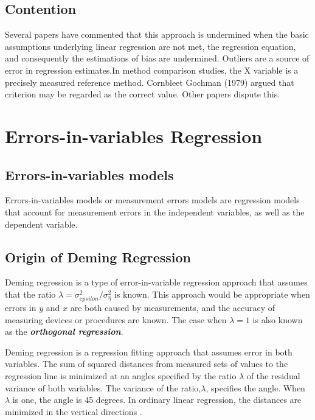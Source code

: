 \documentclass[12pt, a4paper]{report}
\theoremstyle{plain}
\theoremstyle{definition}
\theoremstyle{remark}
\begin{document}



	


\section{Contention }
Several papers have commented that this approach is undermined
when the basic assumptions underlying linear regression are not
met, the regression equation, and consequently the estimations of
bias are undermined. Outliers are a source of error in regression
estimates.In method comparison studies, the X variable is a
precisely measured reference method. Cornbleet Gochman (1979)
argued that criterion may be regarded as the correct value. Other
papers dispute this.







\chapter{Errors-in-variables Regression}





\section{Errors-in-variables models}

Errors-in-variables models or measurement errors models are regression models that account for measurement errors in the independent variables, as well as the dependent variable.


\section{Origin of Deming Regression}

Deming regression is a type of error-in-variable regression approach that assumes that the ratio $\lambda = \sigma^2_{epsilon}/\sigma^2_{\eta}$ is known. This approach would be appropriate when errors in $y$ and $x$ are both caused by measurements, and the accuracy of measuring devices or procedures are known. The case when $\lambda = 1$ is also known as the \textbf{\emph{orthogonal regression}}.

Deming regression is a regression fitting approach that assumes error in both variables.
The sum of squared distances from measured sets of values to the regression line is minimized at an angles specified by the ratio $\lambda$ of the residual variance of both variables. The variance of the ratio,$\lambda$, specifies the angle.  When $\lambda$ is one, the angle is 45 degrees. In ordinary linear regression, the distances are minimized in the vertical directions \citep{linnet99}.
\end{document}
